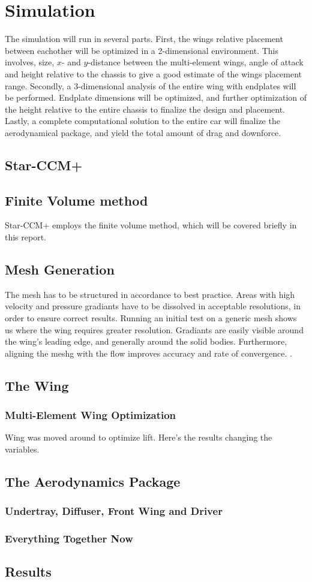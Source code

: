 \chapter{Simulation}

The simulation will run in several parts. First, the wings relative placement between eachother will be optimized in a 2-dimensional environment. This involves, size, $x$- and $y$-distance between the multi-element wings, angle of attack and height relative to the chassis to give a good estimate of the wings placement range. Secondly, a 3-dimensional analysis of the entire wing with endplates will be performed. Endplate dimensions will be optimized, and further optimization of the height relative to the entire chassis to finalize the design and placement. Lastly, a complete computational solution to the entire car will finalize the aerodynamical package, and yield the total amount of drag and downforce.

\section{Star-CCM+}

\section{Finite Volume method}

Star-CCM+ employs the finite volume method, which will be covered briefly in this report. 

\section{Mesh Generation}

The mesh has to be structured in accordance to best practice. Areas with high velocity and pressure gradiants have to be dissolved in acceptable resolutions, in order to ensure correct results. Running an initial test on a generic mesh shows us where the wing requires greater resolution. Gradiants are easily visible around the wing's leading edge, and generally around the solid bodies. Furthermore, aligning the meshg with the flow improves accuracy and rate of convergence. .

\section{The Wing}
\subsection{Multi-Element Wing Optimization}
Wing was moved around to optimize lift. Here's the results changing the variables.
\section{The Aerodynamics Package}
\subsection{Undertray, Diffuser, Front Wing and Driver}
\subsection{Everything Together Now}
\section{Results}
